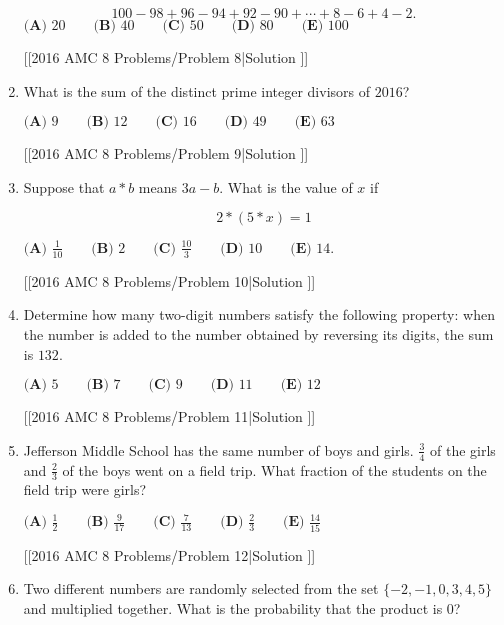 \documentclass{article}
\begin{document}
\begin{enumerate}[label=\arabic*., itemsep=0.5em]
\begin{equation*}
100-98+96-94+92-90+\cdots+8-6+4-2.
\end{equation*}
\(\textbf{(A) }20\qquad\textbf{(B) }40\qquad\textbf{(C) }50\qquad\textbf{(D) }80\qquad \textbf{(E) }100\)

[[2016 AMC 8 Problems/Problem 8|Solution
]]\par \vspace{0.5em}\item What is the sum of the distinct prime integer divisors of \(2016\)?

\(\textbf{(A) }9\qquad\textbf{(B) }12\qquad\textbf{(C) }16\qquad\textbf{(D) }49\qquad \textbf{(E) }63\)

[[2016 AMC 8 Problems/Problem 9|Solution
]]\par \vspace{0.5em}\item Suppose that \(a * b\) means \(3a-b.\) What is the value of \(x\) if

\begin{equation*}
2 * (5 * x)=1
\end{equation*}

\(\textbf{(A) }\frac{1}{10} \qquad\textbf{(B) }2\qquad\textbf{(C) }\frac{10}{3} \qquad\textbf{(D) }10\qquad \textbf{(E) }14.\)

[[2016 AMC 8 Problems/Problem 10|Solution
]]\par \vspace{0.5em}\item Determine how many two-digit numbers satisfy the following property: when the number is added to the number obtained by reversing its digits, the sum is \(132.\)

\(\textbf{(A) }5\qquad\textbf{(B) }7\qquad\textbf{(C) }9\qquad\textbf{(D) }11\qquad \textbf{(E) }12\)

[[2016 AMC 8 Problems/Problem 11|Solution
]]\par \vspace{0.5em}\item Jefferson Middle School has the same number of boys and girls. \(\frac{3}{4}\) of the girls and \(\frac{2}{3}\)
of the boys went on a field trip. What fraction of the students on the field trip were girls?

\(\textbf{(A) }\frac{1}{2}\qquad\textbf{(B) }\frac{9}{17}\qquad\textbf{(C) }\frac{7}{13}\qquad\textbf{(D) }\frac{2}{3}\qquad \textbf{(E) }\frac{14}{15}\)

[[2016 AMC 8 Problems/Problem 12|Solution
]]\par \vspace{0.5em}\item Two different numbers are randomly selected from the set \(\{ - 2, -1, 0, 3, 4, 5\}\) and multiplied together. What is the probability that the product is \(0\)?


\end{enumerate}
\end{document}
